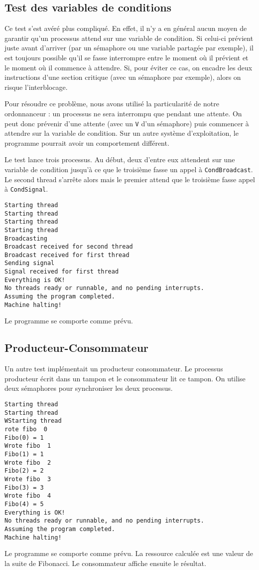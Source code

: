 \documentclass{article}
\def\fun#1{\texttt{#1}}
\begin{document}
\subsection{Test des variables de conditions}
Ce test s'est avéré plus compliqué.
En effet, il n'y a en général aucun moyen de garantir qu'un processus attend sur une variable de condition. Si celui-ci prévient juste avant d'arriver (par un sémaphore ou une variable partagée par exemple), il est toujours possible qu'il se fasse interrompre entre le moment où il prévient et le moment où il commence à attendre. Si, pour éviter ce cas, on encadre les deux instructions d'une section critique (avec un sémaphore par exemple), alors on risque l'interblocage.

Pour résoudre ce problème, nous avons utilisé la particularité de notre ordonnanceur : un processus ne sera interrompu que pendant une attente. On peut donc prévenir d'une attente (avec un \fun{V} d'un sémaphore) puis commencer à attendre sur la variable de condition. Sur un autre système d'exploitation, le programme pourrait avoir un comportement différent.

Le test lance trois processus. Au début, deux d'entre eux attendent sur une variable de condition jusqu'à ce que le troisième fasse un appel à \fun{CondBroadcast}. Le second thread s'arrête alors mais le premier attend que le troisième fasse appel à \fun{CondSignal}. 

\begin{lstlisting}
Starting thread
Starting thread
Starting thread
Starting thread
Broadcasting
Broadcast received for second thread
Broadcast received for first thread
Sending signal
Signal received for first thread
Everything is OK!
No threads ready or runnable, and no pending interrupts.
Assuming the program completed.
Machine halting!
\end{lstlisting}

Le programme se comporte comme prévu.

\subsection{Producteur-Consommateur}
Un autre test implémentait un producteur consommateur. Le processus producteur écrit dans un tampon et le consommateur lit ce tampon. On utilise deux sémaphores pour synchroniser les deux processus.

\begin{lstlisting}
Starting thread
Starting thread
WStarting thread
rote fibo  0
Fibo(0) = 1
Wrote fibo  1
Fibo(1) = 1
Wrote fibo  2
Fibo(2) = 2
Wrote fibo  3
Fibo(3) = 3
Wrote fibo  4
Fibo(4) = 5
Everything is OK!
No threads ready or runnable, and no pending interrupts.
Assuming the program completed.
Machine halting!
\end{lstlisting}

Le programme se comporte comme prévu. La ressource calculée est une valeur de la suite de Fibonacci. Le consommateur affiche ensuite le résultat.

\end{document}
